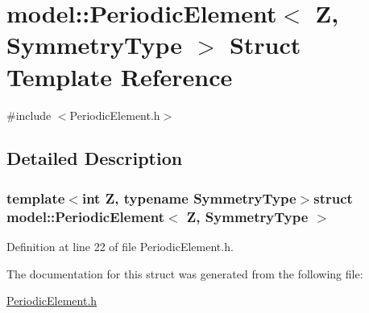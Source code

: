 \hypertarget{structmodel_1_1_periodic_element}{}\section{model\+:\+:Periodic\+Element$<$ Z, Symmetry\+Type $>$ Struct Template Reference}
\label{structmodel_1_1_periodic_element}


{\ttfamily \#include $<$Periodic\+Element.\+h$>$}



\subsection{Detailed Description}
\subsubsection*{template$<$int Z, typename Symmetry\+Type$>$struct model\+::\+Periodic\+Element$<$ Z, Symmetry\+Type $>$}



Definition at line 22 of file Periodic\+Element.\+h.



The documentation for this struct was generated from the following file\+:\begin{DoxyCompactItemize}
\item 
\hyperlink{_periodic_element_8h}{Periodic\+Element.\+h}\end{DoxyCompactItemize}
